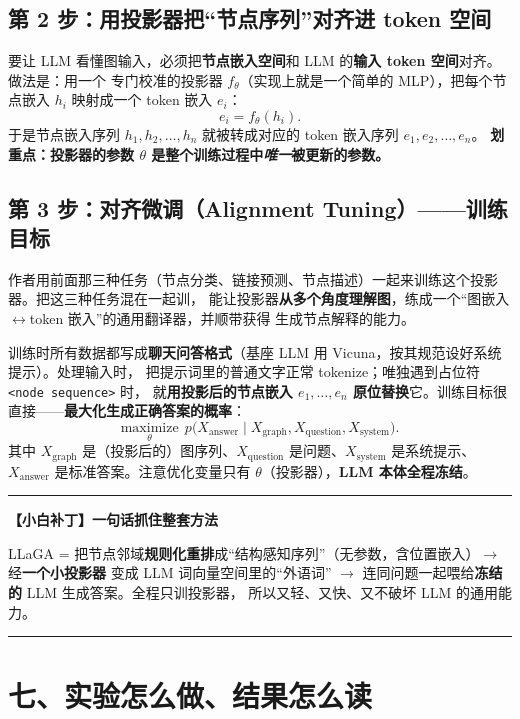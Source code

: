 \documentclass[11pt,UTF8,fontset=fandol]{ctexart}
\newenvironment{tip}[1]{%
  \par\smallskip\noindent\rule{\linewidth}{0.4pt}\par\nobreak
  \noindent\textbf{【小白补丁】#1}\par\nobreak\noindent\ignorespaces
}{%
  \par\noindent\rule{\linewidth}{0.4pt}\par\smallskip
}
\begin{document}
\subsection{第 2 步：用投影器把“节点序列”对齐进 token 空间}

要让 LLM 看懂图输入，必须把\textbf{节点嵌入空间}和 LLM 的\textbf{输入 token 空间}对齐。做法是：用一个
专门校准的投影器 $f_\theta$（实现上就是一个简单的 MLP），把每个节点嵌入 $h_i$ 映射成一个 token 嵌入 $e_i$：
\begin{equation*}
  e_i = f_\theta(h_i).\tag{4}
\end{equation*}
于是节点嵌入序列 $h_1, h_2, \dots, h_n$ 就被转成对应的 token 嵌入序列 $e_1, e_2, \dots, e_n$。
\textbf{划重点：投影器的参数 $\theta$ 是整个训练过程中\emph{唯一}被更新的参数。}

\subsection{第 3 步：对齐微调（Alignment Tuning）——训练目标}

作者用前面那三种任务（节点分类、链接预测、节点描述）一起来训练这个投影器。把这三种任务混在一起训，
能让投影器\textbf{从多个角度理解图}，练成一个“图嵌入$\leftrightarrow$token 嵌入”的通用翻译器，并顺带获得
生成节点解释的能力。

训练时所有数据都写成\textbf{聊天问答格式}（基座 LLM 用 Vicuna，按其规范设好系统提示）。处理输入时，
把提示词里的普通文字正常 tokenize；唯独遇到占位符 \texttt{<node sequence>} 时，
就\textbf{用投影后的节点嵌入 $e_1,\dots,e_n$ 原位替换}它。训练目标很直接——\textbf{最大化生成正确答案的概率}：
\begin{equation*}
  \underset{\theta}{\text{maximize}}\ \ p\big(X_{\text{answer}} \mid X_{\text{graph}}, X_{\text{question}}, X_{\text{system}}\big).\tag{5}
\end{equation*}
其中 $X_{\text{graph}}$ 是（投影后的）图序列、$X_{\text{question}}$ 是问题、$X_{\text{system}}$ 是系统提示、
$X_{\text{answer}}$ 是标准答案。注意优化变量只有 $\theta$（投影器），\textbf{LLM 本体全程冻结}。

\begin{tip}{一句话抓住整套方法}
LLaGA = 把节点邻域\textbf{规则化重排}成“结构感知序列”（无参数，含位置嵌入）$\to$ 经\textbf{一个小投影器}
变成 LLM 词向量空间里的“外语词” $\to$ 连同问题一起喂给\textbf{冻结的} LLM 生成答案。全程只训投影器，
所以又轻、又快、又不破坏 LLM 的通用能力。
\end{tip}

\section{七、实验怎么做、结果怎么读}
\end{document}
